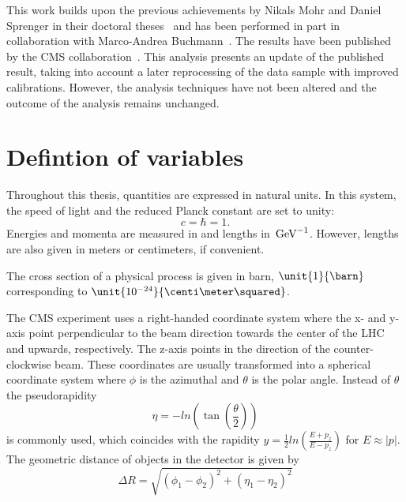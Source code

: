This work builds upon the previous achievements by Nikals Mohr and Daniel Sprenger in their doctoral theses~\cite{Mohr:1423334,Sprenger:1501963} and has been performed in part in collaboration with Marco-Andrea Buchmann~\cite{Buchmann:1704399}. The results have been published by the CMS collaboration~\cite{Khachatryan:2015lwa}. This analysis presents an update of the published result, taking into account a later reprocessing of the data sample with improved calibrations. However, the analysis techniques have not been altered and the outcome of the analysis remains unchanged.

\section{Defintion of variables}
\label{sec:variables}
Throughout this thesis, quantities are expressed in natural units. In this system, the speed of light and the reduced Planck constant are set to unity:
\begin{equation}
c = \hbar = 1.
\end{equation} 
Energies and momenta are measured in \GeV and lengths in $\text{\ensuremath{\,\mathrm{Ge\hspace{-.08em}V}}}^{-1}$. However, lengths are also given in meters or centimeters, if convenient. 

The cross section of a physical process is given in barn, $\unit{1}{\barn}$ corresponding to $\unit{10^{-24}}{\centi\meter\squared}$.   

The CMS experiment uses a right-handed coordinate system where the x- and y-axis point perpendicular to the beam direction towards the center of the LHC and upwards, respectively. The z-axis points in the direction of the counter-clockwise beam.  These coordinates are usually transformed into a spherical coordinate system where $\phi$ is the azimuthal and $\theta$ is the polar angle. Instead of $\theta$ the pseudorapidity 
\begin{equation}
\eta = -ln \left( \tan\left(\frac{\theta}{2}\right)\right)
\end{equation}
is commonly used, which coincides with the rapidity $y = \frac{1}{2} ln\left(\frac{E+p_z}{E-p_z}\right)$ for $E\approx |p|$. The geometric distance of objects in the detector is given by
\begin{equation}
\Delta R = \sqrt{(\phi_1 - \phi_2)^2 + (\eta_1 - \eta_2)^2}
\end{equation}

